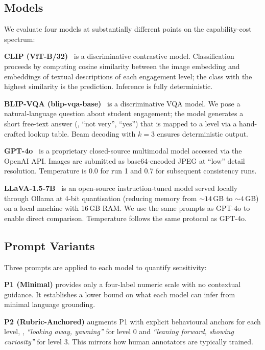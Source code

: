 \subsection{Models}

We evaluate four models at substantially different points on the
capability-cost spectrum:

\textbf{CLIP (ViT-B/32)}~\cite{radford2021learning} is a discriminative
contrastive model.  Classification proceeds by computing cosine
similarity between the image embedding and embeddings of textual
descriptions of each engagement level; the class with the highest
similarity is the prediction.  Inference is fully deterministic.

\textbf{BLIP-VQA (blip-vqa-base)}~\cite{li2022blip} is a discriminative
VQA model.  We pose a natural-language question about student engagement;
the model generates a short free-text answer (\eg, ``not very'',
``yes'') that is mapped to a level via a hand-crafted lookup table.
Beam decoding with $k\!=\!3$ ensures deterministic output.

\textbf{GPT-4o}~\cite{openai2024gpt4o} is a proprietary closed-source
multimodal model accessed via the OpenAI API.  Images are submitted as
base64-encoded JPEG at ``low'' detail resolution.  Temperature is 0.0
for run 1 and 0.7 for subsequent consistency runs.

\textbf{LLaVA-1.5-7B}~\cite{liu2023visual} is an open-source instruction-tuned
model served locally through Ollama at 4-bit quantisation (reducing
memory from ${\sim}14$\,GB to ${\sim}4$\,GB) on a local machine with 16\,GB RAM.
We use the same prompts as GPT-4o to enable direct comparison.
Temperature follows the same protocol as GPT-4o.

\subsection{Prompt Variants}

Three prompts are applied to each model to quantify sensitivity:

\textbf{P1 (Minimal)} provides only a four-label numeric scale with no
contextual guidance.  It establishes a lower bound on what each model
can infer from minimal language grounding.

\textbf{P2 (Rubric-Anchored)} augments P1 with explicit behavioural
anchors for each level, \eg, \emph{``looking away, yawning''} for
level 0 and \emph{``leaning forward, showing curiosity''} for level 3.
This mirrors how human annotators are typically trained.

